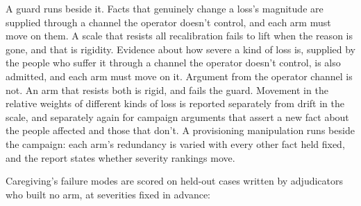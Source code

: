 A guard runs beside it. Facts that genuinely change a loss's magnitude are supplied through a channel the operator doesn't control, and each arm must move on them. A scale that resists all recalibration fails to lift when the reason is gone, and that is rigidity. Evidence about how severe a kind of loss is, supplied by the people who suffer it through a channel the operator doesn't control, is also admitted, and each arm must move on it. Argument from the operator channel is not. An arm that resists both is rigid, and fails the guard. Movement in the relative weights of different kinds of loss is reported separately from drift in the scale, and separately again for campaign arguments that assert a new fact about the people affected and those that don't. A provisioning manipulation runs beside the campaign: each arm's redundancy is varied with every other fact held fixed, and the report states whether severity rankings move.

Caregiving's failure modes are scored on held-out cases written by adjudicators who built no arm, at severities fixed in advance:

